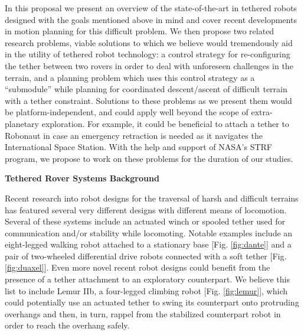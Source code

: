 \documentclass[12pt]{article}
\begin{document}
In this proposal we present an overview of the state-of-the-art in tethered robots designed with the goals 
mentioned above in mind and cover recent developments in motion planning for this difficult problem. 
We then propose two related research problems, viable solutions to which we believe would tremendously aid 
in the utility of tethered robot technology: a control strategy for re-configuring the tether between two 
rovers in order to deal with unforeseen challenges in the terrain, and a planning problem which uses this 
control strategy as a ``submodule'' while planning for coordinated descent/ascent of difficult terrain with 
a tether constraint. Solutions to these problems as we present them would be platform-independent, and could 
apply well beyond the scope of extra-planetary exploration. For example, it could be beneficial to attach a 
tether to Robonaut in case an emergency retraction is needed as it navigates the International Space Station. 
With the help and support of NASA's STRF program, we propose to work on these problems for the duration of our 
studies. 



{\bf\noindent Tethered Rover Systems Background}

Recent research into robot designs for the traversal of harsh and difficult terrains 
has featured several very different designs with different means of locomotion. Several of these systems 
include an actuated winch or spooled tether used for communication and/or stability while locomoting. 
Notable examples include an eight-legged walking robot attached to a stationary base [Fig. \ref{fig:dante}] and a pair of 
two-wheeled differential drive robots connected with a soft tether [Fig. \ref{fig:duaxel}]. Even more novel recent 
robot designs could benefit from the presence of a tether attachment to an exploratory counterpart. We believe 
this list to include Lemur IIb, a four-legged climbing robot [Fig. \ref{fig:lemur}], which could potentially use an actuated 
tether to swing its counterpart onto protruding overhangs and then, in turn, rappel from the stabilized counterpart robot 
in order to reach the overhang safely.
\end{document}

